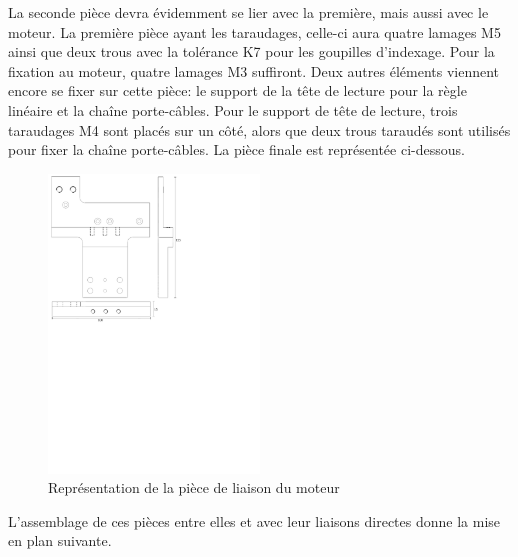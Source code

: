 La seconde pièce devra évidemment se lier avec la première, mais aussi avec le moteur. La première pièce ayant les taraudages, celle-ci aura
quatre lamages M5 ainsi que deux trous avec la tolérance K7 pour les goupilles d'indexage. Pour la fixation au moteur, quatre lamages M3 suffiront. Deux autres
éléments viennent encore se fixer sur cette pièce: le support de la tête de lecture pour la règle linéaire et la chaîne porte-câbles. Pour le
support de tête de lecture, trois taraudages M4 sont placés sur un côté, alors que deux trous taraudés sont utilisés pour fixer la chaîne
porte-câbles. La pièce finale est représentée ci-dessous.

\begin{figure}[H]
    \centering
    \includegraphics[width = 0.5\textwidth]{assets/figures/LiaisonMoteur.svg}
    \caption{Représentation de la pièce de liaison du moteur}
    \label{fig:LiaisonMoteur}
\end{figure}

L'assemblage de ces pièces entre elles et avec leur liaisons directes donne la mise en plan suivante.

